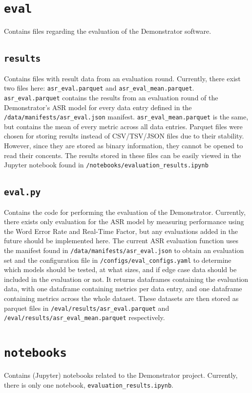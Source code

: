 \section{\texttt{eval}}
Contains files regarding the evaluation of the Demonstrator software.

\subsection{\texttt{results}}
Contains files with result data from an evaluation round.
Currently, there exist two files here: \texttt{asr\_eval.parquet} and \texttt{asr\_eval\_mean.parquet}.
\texttt{asr\_eval.parquet} contains the results from an evaluation round of the Demonstrator's ASR model for every data entry defined in the \texttt{/data/manifests/asr\_eval.json} manifest.
\texttt{asr\_eval\_mean.parquet} is the same, but contains the mean of every metric across all data entries.
Parquet files were chosen for storing results instead of CSV/TSV/JSON files due to their stability.
However, since they are stored as binary information, they cannot be opened to read their concents.
The results stored in these files can be easily viewed in the Jupyter notebook found in \texttt{/notebooks/evaluation\_results.ipynb}

\subsection{\texttt{eval.py}}
Contains the code for performing the evaluation of the Demonstrator.
Currently, there exists only evaluation for the ASR model by measuring performance using the Word Error Rate and Real-Time Factor, but any evaluations added in the future should be implemented here.
The current ASR evaluation function uses the manifest found in \texttt{/data/manifests/asr\_eval.json} to obtain an evaluation set and the configuration file in \texttt{/configs/eval\_configs.yaml} to determine which models should be tested, at what sizes, and if edge case data should be included in the evaluation or not.
It returns dataframes containing the evaluation data, with one dataframe containing metrics per data entry, and one dataframe containing metrics across the whole dataset.
These datasets are then stored as parquet files in \texttt{/eval/results/asr\_eval.parquet} and \texttt{/eval/results/asr\_eval\_mean.parquet} respectively.

\section{\texttt{notebooks}}
Contains (Jupyter) notebooks related to the Demonstrator project.
Currently, there is only one notebook, \texttt{evaluation\_results.ipynb}.

